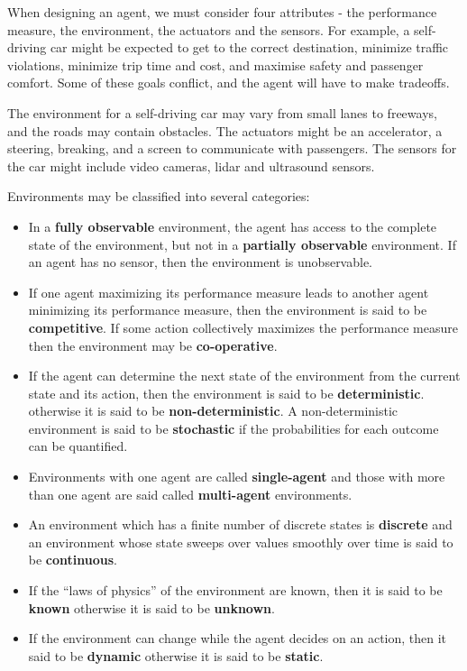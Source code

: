 \documentclass{article}
\begin{document}
When designing an agent, we must consider four attributes - the performance measure,
the environment, the actuators and the sensors. For example, a self-driving car might 
be expected to get to the correct destination, minimize traffic violations, minimize
trip time and cost, and maximise safety and passenger comfort. Some of these goals
conflict, and the agent will have to make tradeoffs.

The environment for a self-driving car may vary from small lanes to freeways, and the
roads may contain obstacles. The actuators might be an accelerator, a steering, breaking,
and a screen to communicate with passengers. The sensors for the car might include video
cameras, lidar and ultrasound sensors. 

Environments may be classified into several categories:

\begin{itemize}
    \item In a \textbf{fully observable} environment, the agent has access to the complete state of the environment,
        but not in a \textbf{partially observable} environment. If an agent has no sensor, then the
        environment is unobservable.
    \item If one agent maximizing its performance measure leads to another agent minimizing
        its performance measure, then the environment is said to be \textbf{competitive}. If
        some action collectively maximizes the performance measure then the environment
        may be \textbf{co-operative}.
    \item If the agent can determine the next state of the environment from the current
        state and its action, then the environment is said to be \textbf{deterministic}.
        otherwise it is said to be \textbf{non-deterministic}. A non-deterministic
        environment is said to be \textbf{stochastic} if the probabilities for each
        outcome can be quantified. 
    \item Environments with one agent are called \textbf{single-agent} and those with
        more than one agent are said called \textbf{multi-agent} environments.
    \item An environment which has a finite number of discrete states is \textbf{discrete}
        and an environment whose state sweeps over values smoothly over time is said
        to be \textbf{continuous}.
    \item If the ``laws of physics'' of the environment are known, then it is said to
        be \textbf{known} otherwise it is said to be \textbf{unknown}.
    \item If the environment can change while the agent decides on an action, then it
        said to be \textbf{dynamic} otherwise it is said to be \textbf{static}.
\end{itemize}
\end{document}
